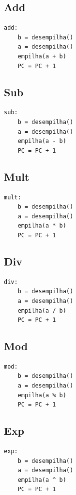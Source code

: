 \documentclass[a4paper,12pt,headings=small]{article}
\begin{document}
\newpage

\subsection{Add}
\begin{lstlisting}
add:
	b = desempilha()
	a = desempilha()
	empilha(a + b)
	PC = PC + 1

\end{lstlisting}

\subsection{Sub}
\begin{lstlisting}
sub:
	b = desempilha()
	a = desempilha()
	empilha(a - b)
	PC = PC + 1

\end{lstlisting}


\subsection{Mult}
\begin{lstlisting}
mult:
	b = desempilha()
	a = desempilha()
	empilha(a * b)
	PC = PC + 1

\end{lstlisting}


\subsection{Div}
\begin{lstlisting}
div:
	b = desempilha()
	a = desempilha()
	empilha(a / b)
	PC = PC + 1

\end{lstlisting}


\subsection{Mod}
\begin{lstlisting}
mod:
	b = desempilha()
	a = desempilha()
	empilha(a % b)
	PC = PC + 1

\end{lstlisting}


\subsection{Exp}
\begin{lstlisting}
exp:
	b = desempilha()
	a = desempilha()
	empilha(a ^ b)
	PC = PC + 1

\end{lstlisting}
\end{document}

